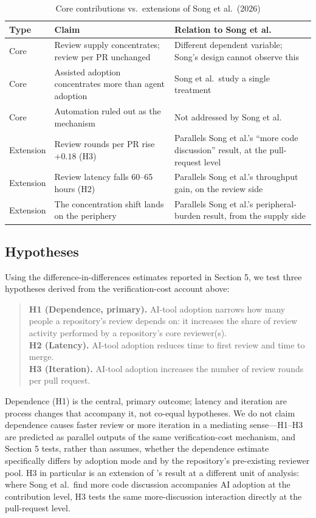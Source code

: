 \documentclass[12pt]{article}
\begin{document}
\begin{table}[htbp]
\centering
\caption{Core contributions vs.\ extensions of Song et al.\ (2026)}
\label{tab:core-vs-extension}
\small
\begin{tabular}{llp{5cm}}
\toprule
Type & Claim & Relation to Song et al. \\
\midrule
Core & Review supply concentrates; review per PR unchanged & Different
  dependent variable; Song's design cannot observe this \\
Core & Assisted adoption concentrates more than agent adoption & Song
  et al.\ study a single treatment \\
Core & Automation ruled out as the mechanism & Not addressed by Song
  et al. \\
\addlinespace
Extension & Review rounds per PR rise $+0.18$ (H3) & Parallels Song et
  al.'s ``more code discussion'' result, at the pull-request level \\
Extension & Review latency falls 60--65 hours (H2) & Parallels Song et
  al.'s throughput gain, on the review side \\
Extension & The concentration shift lands on the periphery & Parallels
  Song et al.'s peripheral-burden result, from the supply side \\
\bottomrule
\end{tabular}
\end{table}

\subsection{Hypotheses}

Using the difference-in-differences estimates reported in Section 5, we
test three hypotheses derived from the verification-cost account above:

\begin{quote}
\textbf{H1 (Dependence, primary).} AI-tool adoption narrows how many
people a repository's review depends on: it increases the share of
review activity performed by a repository's core reviewer(s).\\
\textbf{H2 (Latency).} AI-tool adoption reduces time to first review and
time to merge.\\
\textbf{H3 (Iteration).} AI-tool adoption increases the number of review
rounds per pull request.
\end{quote}

Dependence (H1) is the central, primary outcome; latency and iteration
are process changes that accompany it, not co-equal hypotheses. We do
not claim dependence causes faster review or more iteration in a
mediating sense---H1--H3 are predicted as parallel outputs of the same
verification-cost mechanism, and Section 5 tests, rather than assumes,
whether the dependence estimate specifically differs by adoption mode
and by the repository's pre-existing reviewer pool. H3 in particular is
an extension of \citet{song2026impact}'s result at a different unit of
analysis: where Song et al.\ find more code discussion accompanies AI
adoption at the contribution level, H3 tests the same
more-discussion interaction directly at the pull-request level.
\end{document}
